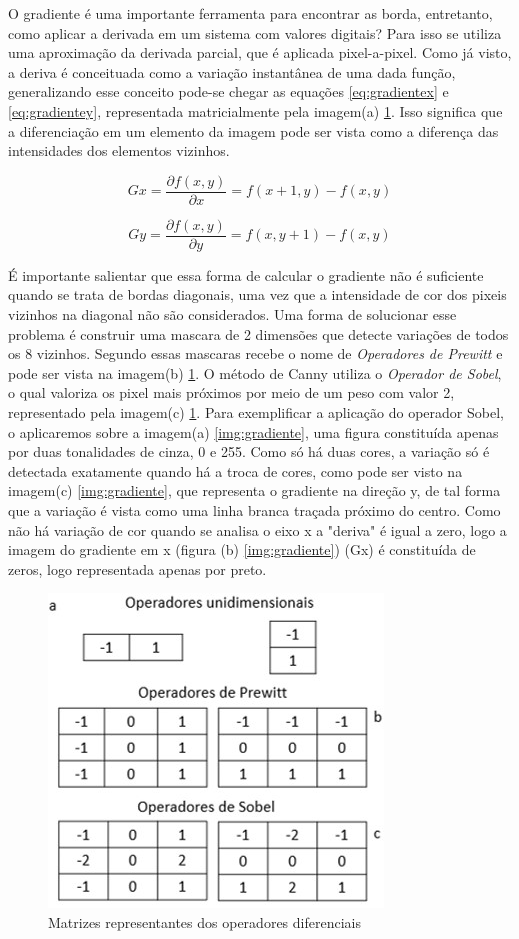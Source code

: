 \documentclass[a4paper,alpha-refs]{RBCA_v1.0}
\begin{document}
O gradiente é uma importante ferramenta para encontrar as borda, entretanto, como aplicar a derivada em um sistema com valores digitais? Para isso se utiliza uma aproximação da derivada parcial, que é aplicada pixel-a-pixel. Como já visto, a deriva é conceituada como a variação instantânea de uma dada função, generalizando esse conceito pode-se chegar as equações \ref{eq:gradientex} e \ref{eq:gradientey}, representada matricialmente pela imagem(a) \ref{img:mascara}. Isso significa que a diferenciação em um elemento da imagem pode ser vista como a diferença das intensidades dos elementos vizinhos.  

\begin{equation}
	Gx = \frac{\partial f(x,y)}{\partial x} = f(x + 1,y) - f(x,y)
	\label{eq:gradientex}	
\end{equation}

\begin{equation}
	Gy = \frac{\partial f(x,y)}{\partial y} = f(x ,y+ 1) - f(x,y)
\label{eq:gradientey}
\end{equation}

É importante salientar que essa forma de calcular o gradiente não é suficiente quando se trata de bordas diagonais, uma vez que a intensidade de cor dos pixeis vizinhos na diagonal não são considerados. Uma forma de solucionar esse problema é construir uma mascara de 2 dimensões que detecte variações de todos os 8 vizinhos. Segundo \cite{ProcDigital} essas mascaras recebe o nome de \textit{Operadores de Prewitt} e pode ser vista na imagem(b) \ref{img:mascara}. O método de Canny utiliza o \textit{Operador de Sobel}, o qual valoriza os pixel mais próximos por meio de um peso com valor 2, representado pela imagem(c) \ref{img:mascara}. Para exemplificar a aplicação do operador Sobel, o aplicaremos sobre a imagem(a) \ref{img:gradiente}, uma figura constituída apenas por duas tonalidades de cinza, 0 e 255. Como só há duas cores, a variação só é detectada exatamente quando há a troca de cores, como pode ser visto na imagem(c) \ref{img:gradiente}, que representa o gradiente na direção y, de tal forma que a variação é vista como uma linha branca traçada próximo do centro. Como não há variação de cor quando se analisa o eixo x a "deriva" é igual a zero, logo a imagem do gradiente em x (figura (b) \ref{img:gradiente}) (Gx) é constituída de zeros, logo representada apenas por preto.

\begin{figure}[h!]
	\centering
	\includegraphics[width=.5\textwidth]{img/mascara.jpg}
	\caption{Matrizes representantes dos operadores diferenciais}
	\label{img:mascara}
\end{figure}
\end{document}
